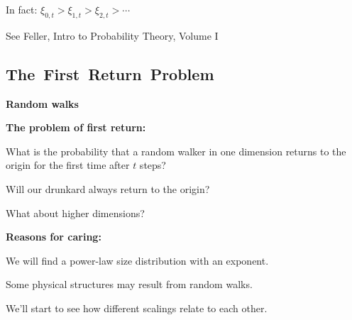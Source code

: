       In fact:
      $\xi_{0,t} > \xi_{1,t} > \xi_{2,t} > \cdots $
    
    
    {\small See Feller, Intro to Probability Theory, Volume I\cite{feller1968a}} 
  




\subsection{The\ First\ Return\ Problem}

  \textbf{Random walks \hfill {}}

  \textbf{The problem of first return:}
    
     
      What is the probability that a random walker
      in one dimension returns to the origin
      for the first time after $t$ steps?
     
      Will our drunkard always return to the origin?
     
      What about higher dimensions?
    
  

  \textbf{Reasons for caring:}
    
     
      We will find a power-law size distribution
      with an  exponent.
     
      Some physical structures may result from random walks.
     
      We'll start to see how different scalings relate to each other.
    
  





